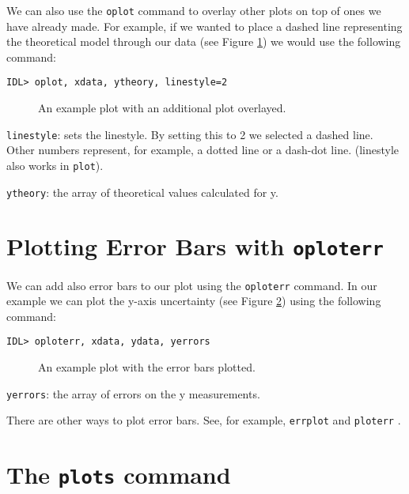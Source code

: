\documentclass[preprint]{aastex}
\begin{document}
We can also use the {\tt oplot} command to overlay other plots on top
of ones we have already made.  For example, if we wanted to place a
dashed line representing the theoretical model through our data (see
Figure   \ref{ex2}) we would use the following command:

\begin{verbatim}
IDL> oplot, xdata, ytheory, linestyle=2
\end{verbatim}

\begin{figure}[!ht]
\begin{center}
\leavevmode
{}
\end{center}
\caption{An example plot with an additional plot overlayed.}\label{ex2}
\end{figure}

{\tt linestyle}:  sets the linestyle.  By setting this to 2 we selected
a dashed line.  Other numbers represent, for example, a dotted line or a
dash-dot line.  (linestyle also works in {\tt plot}).

{\tt ytheory}:  the array of theoretical values calculated for y. 

\section{Plotting Error Bars with {\tt oploterr}}\label{ploterr}

	We can add also error bars to our plot using the {\tt oploterr}
command.  In our example we can plot the y-axis uncertainty (see Figure  
\ref{ex3}) using the following command:

\begin{verbatim}
IDL> oploterr, xdata, ydata, yerrors
\end{verbatim}

\begin{figure}[!ht]
\begin{center}
\leavevmode
{}
\end{center}
\caption{An example plot with the error bars plotted.}\label{ex3}
\end{figure}

{\tt yerrors}:  the array of errors on the y measurements.

	There are other ways to plot error bars.  See, for example, {\tt errplot}  and {\tt ploterr} .

\section{The {\tt plots} command}\label{plots}
\end{document}
